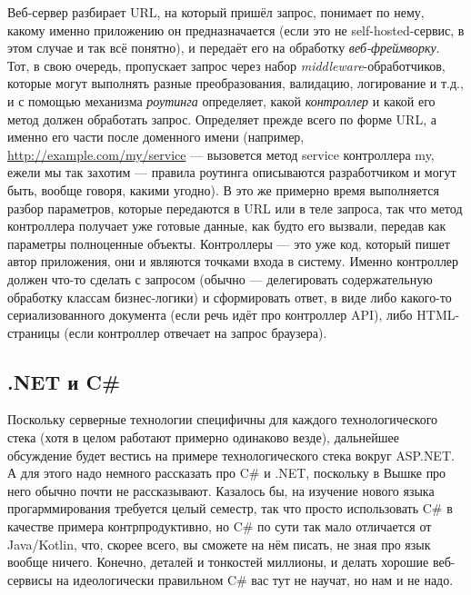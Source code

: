 \documentclass[a5paper]{article}
\begin{document}
Веб-сервер разбирает URL, на который пришёл запрос, понимает по нему, какому именно приложению он предназначается (если это не self-hosted-сервис, в этом случае и так всё понятно), и передаёт его на обработку \emph{веб-фреймворку}. Тот, в свою очередь, пропускает запрос через набор \emph{middleware}-обработчиков, которые могут выполнять разные преобразования, валидацию, логирование и т.д., и с помощью механизма \emph{роутинга} определяет, какой \emph{контроллер} и какой его метод должен обработать запрос. Определяет прежде всего по форме URL, а именно его части после доменного имени (например, \url{http://example.com/my/service} --- вызовется метод service контроллера my, ежели мы так захотим --- правила роутинга описываются разработчиком и могут быть, вообще говоря, какими угодно). В это же примерно время выполняется разбор параметров, которые передаются в URL или в теле запроса, так что метод контроллера получает уже готовые данные, как будто его вызвали, передав как параметры полноценные объекты. Контроллеры --- это уже код, который пишет автор приложения, они и являются точками входа в систему. Именно контроллер должен что-то сделать с запросом (обычно --- делегировать содержательную обработку классам бизнес-логики) и сформировать ответ, в виде либо какого-то сериализованного документа (если речь идёт про контроллер API), либо HTML-страницы (если контроллер отвечает на запрос браузера).

\subsection{.NET и C\#}

Поскольку серверные технологии специфичны для каждого технологического стека (хотя в целом работают примерно одинаково везде), дальнейшее обсуждение будет вестись на примере технологического стека вокруг ASP.NET. А для этого надо немного рассказать про C\# и .NET, поскольку в Вышке про него обычно почти не рассказывают. Казалось бы, на изучение нового языка прогарммирования требуется целый семестр, так что просто использовать C\# в качестве примера контрпродуктивно, но C\# по сути так мало отличается от Java/Kotlin, что, скорее всего, вы сможете на нём писать, не зная про язык вообще ничего. Конечно, деталей и тонкостей миллионы, и делать хорошие веб-сервисы на идеологически правильном C\# вас тут не научат, но нам и не надо.
\end{document}
